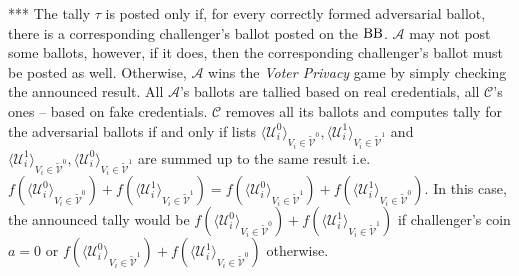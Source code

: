 *** The tally $\tau$ is posted only if, for every correctly formed adversarial ballot, there is a corresponding challenger's ballot posted on the $\operatorname{BB}$. $\mathcal{A}$ may not post some ballots, however, if it does, then the corresponding challenger's ballot must be posted as well. Otherwise, $\mathcal{A}$ wins the \textit{Voter Privacy} game by simply checking the announced result.  All $\mathcal{A}$'s ballots are tallied based on real credentials, all  $\mathcal{C}$'s ones -- based on fake credentials.   $\mathcal{C}$ removes all its  ballots and computes tally for the adversarial ballots if and only if  lists $\langle \mathcal{U}^0_i \rangle _{V_i \in \tilde{\mathcal{V}}^0}, \langle \mathcal{U}^1_i \rangle _{V_i \in \tilde{\mathcal{V}}^1}$ and $\langle \mathcal{U}^1_i \rangle _{V_i \in \tilde{\mathcal{V}}^0}, \langle \mathcal{U}^0_i \rangle _{V_i \in \tilde{\mathcal{V}}^1}$ are summed up to the same result i.e. $f(\langle \mathcal{U}^0_i \rangle _{V_i \in \tilde{\mathcal{V}}^0} ) + f(\langle \mathcal{U}^1_i \rangle _{V_i \in \tilde{\mathcal{V}}^1} ) =  f(\langle \mathcal{U}^0_i \rangle _{V_i \in \tilde{\mathcal{V}}^1} ) +  f(\langle \mathcal{U}^1_i \rangle _{V_i \in \tilde{\mathcal{V}}^0} )$. In this case, the announced tally would be $f(\langle \mathcal{U}^0_i \rangle _{V_i \in \tilde{\mathcal{V}}^0} ) + f(\langle \mathcal{U}^1_i \rangle _{V_i \in \tilde{\mathcal{V}}^1} )$ if challenger's coin $a=0$ or  $f(\langle \mathcal{U}^0_i \rangle _{V_i \in \tilde{\mathcal{V}}^1} ) +  f(\langle \mathcal{U}^1_i \rangle _{V_i \in \tilde{\mathcal{V}}^0} )$ otherwise.\\

